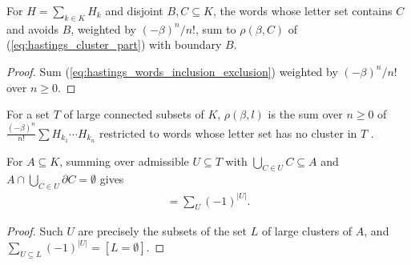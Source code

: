 \begin{lemma}
    \label{thm:hastings_cluster_part_words}
    \leanok
    For $H=\sum_{k\in K}H_k$ and disjoint $B,C\subseteq K$, the words whose
    letter set contains $C$ and avoids $B$, weighted by $(-\beta)^n/n!$, sum to
    $\rho(\beta,C)$ of (\ref{eq:hastings_cluster_part}) with boundary $B$.
\end{lemma}
\begin{proof}
    \leanok
    Sum (\ref{eq:hastings_words_inclusion_exclusion}) weighted by
    $(-\beta)^n/n!$ over $n\ge0$.
\end{proof}

\begin{definition}
    \label{def:hastings_truncated_expansion}
    \leanok
    For a set $T$ of large connected subsets of $K$, $\rho(\beta,l)$ is the sum
    over $n\ge0$ of $\frac{(-\beta)^n}{n!}\sum H_{k_1}\cdots H_{k_n}$ restricted
    to words whose letter set has no cluster in $T$
    \cite[lines 1101--1104]{Hastings2006Solving}.
\end{definition}

\begin{lemma}
    \label{thm:hastings_word_large_clusters}
    \leanok
    For $A\subseteq K$, summing over admissible $U\subseteq T$ with
    $\bigcup_{C\in U}C\subseteq A$ and
    $A\cap\bigcup_{C\in U}\partial C=\emptyset$ gives
    \begin{align}
        [\text{no cluster of }A\text{ lies in }T]
        =\sum_{U}(-1)^{|U|}.
        \label{eq:hastings_word_large_clusters}
    \end{align}
\end{lemma}
\begin{proof}
    \leanok
    Such $U$ are precisely the subsets of the set $L$ of large clusters of $A$,
    and $\sum_{U\subseteq L}(-1)^{|U|}=[L=\emptyset]$.
\end{proof}

